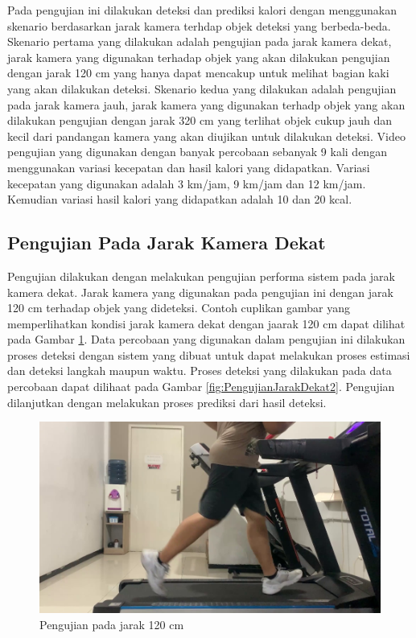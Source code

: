 Pada pengujian ini dilakukan deteksi dan prediksi kalori dengan menggunakan skenario berdasarkan jarak kamera terhdap objek deteksi yang berbeda-beda. Skenario pertama yang dilakukan adalah pengujian pada jarak kamera dekat, jarak kamera yang digunakan terhadap objek yang akan dilakukan pengujian dengan jarak 120 cm yang hanya dapat mencakup untuk melihat bagian kaki yang akan dilakukan deteksi. Skenario kedua yang dilakukan adalah pengujian pada jarak kamera jauh, jarak kamera yang digunakan terhadp objek yang akan dilakukan pengujian dengan jarak 320 cm yang terlihat objek cukup jauh dan kecil dari pandangan kamera yang akan diujikan untuk dilakukan deteksi. Video pengujian yang digunakan dengan banyak percobaan sebanyak 9 kali dengan menggunakan variasi kecepatan dan hasil kalori yang didapatkan. Variasi kecepatan yang digunakan adalah 3 km/jam, 9 km/jam dan 12 km/jam. Kemudian variasi hasil kalori yang didapatkan adalah 10 dan 20 kcal. 

\subsection{Pengujian Pada Jarak Kamera Dekat}
\label{subsec:PengujianJarakDekat}

Pengujian dilakukan dengan melakukan pengujian performa sistem pada jarak kamera dekat. Jarak kamera yang digunakan pada pengujian ini dengan jarak 120 cm terhadap objek yang dideteksi. Contoh cuplikan gambar yang memperlihatkan kondisi jarak kamera dekat dengan jaarak 120 cm dapat dilihat pada Gambar \ref{fig:PengujianJarakDekat}. Data percobaan yang digunakan dalam pengujian ini dilakukan proses deteksi dengan sistem yang dibuat untuk dapat melakukan proses estimasi dan deteksi langkah maupun waktu. Proses deteksi yang dilakukan pada data percobaan dapat dilihaat pada Gambar \ref{fig:PengujianJarakDekat2}. Pengujian dilanjutkan dengan melakukan proses prediksi dari hasil deteksi.

\begin{figure}[H]
  \centering
  \includegraphics[scale=0.5]{gambar/jarak_dekat.png}
  \caption{Pengujian pada jarak 120 cm}
  \label{fig:PengujianJarakDekat}
\end{figure}

